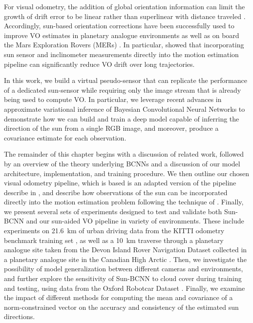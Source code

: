 




For visual odometry, the addition of global orientation information can limit the growth of drift error to be linear rather than superlinear with distance traveled \citep{Olson2003-ax}. Accordingly, sun-based orientation corrections have been successfully used to improve VO estimates in planetary analogue environments \citep{Furgale2011-zu,Lambert2012-sn} as well as on board the Mars Exploration Rovers (MERs) \citep{Eisenman2002-cg,Maimone2007-tc}. In particular, \cite{Lambert2012-sn} showed that incorporating sun sensor and inclinometer measurements directly into the motion estimation pipeline can significantly reduce VO drift over long trajectories.


In this work, we build a virtual pseudo-sensor that can replicate the performance of a dedicated sun-sensor while requiring only the image stream that is already being used to compute VO. In particular, we leverage recent advances in approximate variational inference of Bayesian Convolutional Neural Networks to demonstrate how we can build and train a deep model capable of inferring the direction of the sun from a single RGB image, and moreover, produce a covariance estimate for each observation. 




The remainder of this chapter begins with a discussion of related work, followed by an overview of the theory underlying BCNNs and a discussion of our model architecture, implementation, and training procedure.
We then outline our chosen visual odometry pipeline, which is based is an adapted version of the pipeline describe in , and describe how observations of the sun can be incorporated directly into the motion estimation problem following the technique of \citet{Lambert2012-sn}.
Finally, we present several sets of experiments designed to test and validate both Sun-BCNN and our sun-aided VO pipeline in variety of environments.
These include experiments on 21.6~km of urban driving data from the KITTI odometry benchmark training set \citep{Geiger2013-ky}, as well as a 10~km traverse through a planetary analogue site taken from the Devon Island Rover Navigation Dataset collected in a planetary analogue site in the Canadian High Arctic \citep{Furgale2012-kk}.
Then, we investigate the possibility of model generalization between different cameras and environments, and further explore the sensitivity of Sun-BCNN to cloud cover during training and testing, using data from the Oxford Robotcar Dataset \citep{Maddern2016-ng}.
Finally, we examine the impact of different methods for computing the mean and covariance of a norm-constrained vector on the accuracy and consistency of the estimated sun directions.

